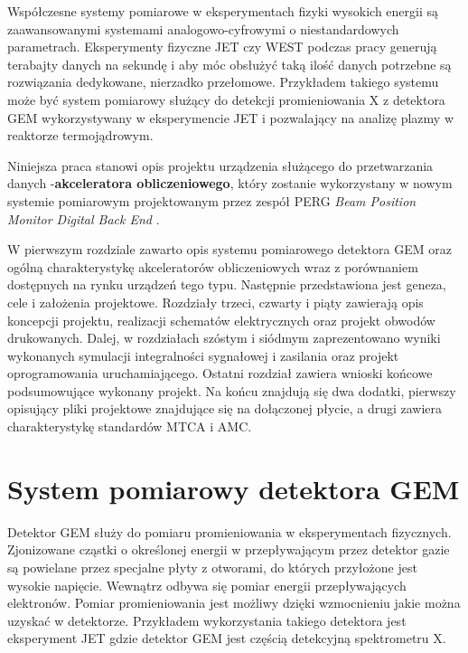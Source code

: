 

Współczesne systemy pomiarowe w eksperymentach fizyki wysokich energii są zaawansowanymi systemami analogowo-cyfrowymi o niestandardowych parametrach. Eksperymenty fizyczne JET \cite{JET} czy WEST \cite{WEST}  podczas pracy generują terabajty danych na sekundę i aby móc obsłużyć taką ilość danych potrzebne są rozwiązania dedykowane, nierzadko przełomowe. Przykładem takiego systemu może być system pomiarowy służący do detekcji promieniowania X z detektora GEM \cite{GEM} wykorzystywany w eksperymencie JET i pozwalający na analizę plazmy w reaktorze termojądrowym. 

 Niniejsza praca stanowi opis projektu urządzenia służącego do przetwarzania danych -\textbf{akceleratora obliczeniowego}, który zostanie wykorzystany w nowym systemie pomiarowym projektowanym przez zespół PERG \textit{Beam Position Monitor Digital Back End} \cite{BPMDBM}.
 
  
  W pierwszym rozdziale zawarto opis systemu pomiarowego detektora GEM oraz ogólną charakterystykę akceleratorów obliczeniowych wraz z porównaniem dostępnych na rynku urządzeń tego typu. Następnie przedstawiona jest geneza, cele i założenia projektowe. Rozdziały trzeci, czwarty i piąty zawierają opis koncepcji projektu, realizacji schematów elektrycznych oraz projekt obwodów drukowanych. Dalej, w rozdziałach szóstym i siódmym zaprezentowano wyniki wykonanych symulacji integralności sygnałowej i zasilania oraz projekt oprogramowania uruchamiającego. Ostatni rozdział zawiera wnioski końcowe podsumowujące wykonany projekt. Na końcu znajdują się dwa dodatki, pierwszy opisujący pliki projektowe znajdujące się na dołączonej płycie, a drugi zawiera charakterystykę standardów MTCA i AMC.
  
\section{System pomiarowy detektora GEM}
Detektor GEM służy do pomiaru promieniowania w eksperymentach fizycznych. Zjonizowane cząstki o określonej energii w przepływającym przez detektor gazie są powielane przez specjalne płyty z otworami, do których przyłożone jest wysokie napięcie. Wewnątrz odbywa się pomiar energii przepływających elektronów. Pomiar promieniowania jest możliwy dzięki wzmocnieniu jakie można uzyskać w detektorze. Przykładem wykorzystania takiego detektora jest eksperyment JET gdzie detektor GEM jest częścią detekcyjną spektrometru X. 

